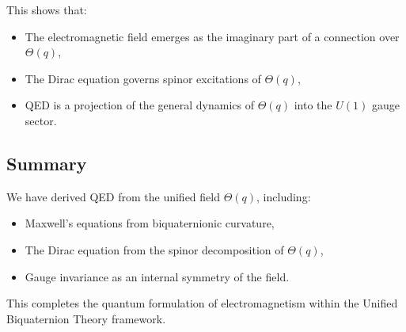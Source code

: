 This shows that:

\begin{itemize}
  \item The electromagnetic field emerges as the imaginary part of a connection over \(\Theta(q)\),
  \item The Dirac equation governs spinor excitations of \(\Theta(q)\),
  \item QED is a projection of the general dynamics of \(\Theta(q)\) into the \(U(1)\) gauge sector.
\end{itemize}

\subsection*{Summary}

We have derived QED from the unified field \(\Theta(q)\), including:
\begin{itemize}
  \item Maxwell's equations from biquaternionic curvature,
  \item The Dirac equation from the spinor decomposition of \(\Theta(q)\),
  \item Gauge invariance as an internal symmetry of the field.
\end{itemize}

This completes the quantum formulation of electromagnetism within the Unified Biquaternion Theory framework.
